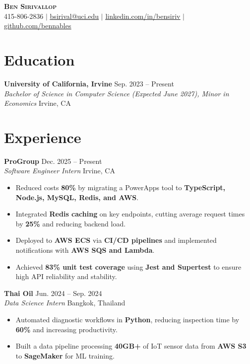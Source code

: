 \documentclass[letterpaper,11pt]{article}
\renewcommand\ULdepth{1.8pt}
\begin{document}
\renewcommand{\ULdepth}{4pt}

\begin{center}
    \textbf{\Huge \scshape Ben Sirivallop} \\ \vspace{1pt}
    \small 415-806-2836 $|$ \href{mailto:bsirival@uci.edu}{\uline{bsirival@uci.edu}} $|$
\href{https://linkedin.com/in/bensiriv}{\uline{linkedin.com/in/bensiriv}} $|$
\href{https://github.com/bennables}{\uline{github.com/bennables}}
\end{center}

\section*{Education}
\textbf{University of California, Irvine} \hfill Sep. 2023 -- Present \\
\textit{Bachelor of Science in Computer Science (Expected June 2027), Minor in Economics} \hfill Irvine, CA

\section*{Experience}
\textbf{ProGroup} \hfill Dec. 2025 -- Present \\
\textit{Software Engineer Intern} \hfill Irvine, CA
\begin{itemize}
  \item Reduced costs \textbf{80\%} by migrating a PowerApps tool to \textbf{TypeScript, Node.js, MySQL, Redis, and AWS}.
  \item Integrated \textbf{Redis caching} on key endpoints, cutting average request times by \textbf{25\%} and reducing backend load.
  \item Deployed to \textbf{AWS ECS} via \textbf{CI/CD pipelines} and implemented notifications with \textbf{AWS SQS and Lambda}.
  \item Achieved \textbf{83\% unit test coverage} using \textbf{Jest and Supertest} to ensure high API reliability and stability.
\end{itemize}

\textbf{Thai Oil} \hfill Jun. 2024 -- Sep. 2024 \\
\textit{Data Science Intern} \hfill Bangkok, Thailand
\begin{itemize}
  \item Automated diagnostic workflows in \textbf{Python}, reducing inspection time by \textbf{60\%} and increasing productivity.
  \item Built a data pipeline processing \textbf{40GB+} of IoT sensor data from \textbf{AWS S3} to \textbf{SageMaker} for ML training.
\end{itemize}
\end{document}
